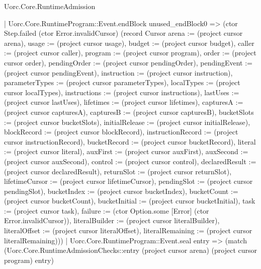 \begin{lexlean}{Uorc.Core.RuntimeAdmission}
\begin{semanticmodule}
{          | Uorc.Core.RuntimeProgram::Event.endBlock unused_endBlock0 => (ctor Step.failed (ctor Error.invalidCursor) (record Cursor {arena := (project cursor arena), usage := (project cursor usage), budget := (project cursor budget), caller := (project cursor caller), program := (project cursor program), order := (project cursor order), pendingOrder := (project cursor pendingOrder), pendingEvent := (project cursor pendingEvent), instruction := (project cursor instruction), parameterTypes := (project cursor parameterTypes), localTypes := (project cursor localTypes), instructions := (project cursor instructions), lastUses := (project cursor lastUses), lifetimes := (project cursor lifetimes), capturesA := (project cursor capturesA), capturesB := (project cursor capturesB), bucketSlots := (project cursor bucketSlots), initialRelease := (project cursor initialRelease), blockRecord := (project cursor blockRecord), instructionRecord := (project cursor instructionRecord), bucketRecord := (project cursor bucketRecord), literal := (project cursor literal), auxFirst := (project cursor auxFirst), auxSecond := (project cursor auxSecond), control := (project cursor control), declaredResult := (project cursor declaredResult), returnSlot := (project cursor returnSlot), lifetimeCursor := (project cursor lifetimeCursor), pendingSlot := (project cursor pendingSlot), bucketIndex := (project cursor bucketIndex), bucketCount := (project cursor bucketCount), bucketInitial := (project cursor bucketInitial), task := (project cursor task), failure := (ctor Option.some [Error] (ctor Error.invalidCursor)), literalBuilder := (project cursor literalBuilder), literalOffset := (project cursor literalOffset), literalRemaining := (project cursor literalRemaining)}))
          | Uorc.Core.RuntimeProgram::Event.seal entry => (match (Uorc.Core.RuntimeAdmissionChecks::entry (project cursor arena) (project cursor program) entry)
}
\end{semanticmodule}
\end{lexlean}
